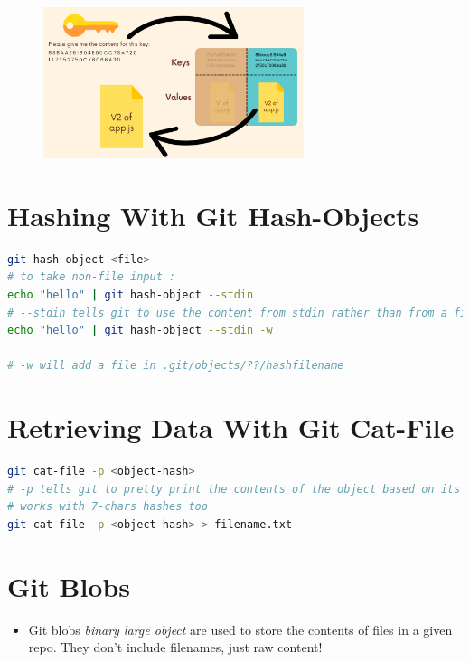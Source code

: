 \documentclass{report}
\begin{document}
\begin{figure}[H] 
	 \centering 
	 \includegraphics[width=3in]{screenshots/2022-07-10T15-18-37Z.png} 
\end{figure}


\section{Hashing With Git Hash-Objects}

\begin{tcolorbox}[title=Try Hashing,colback=backcolour]
\begin{lstlisting}[language=bash]
git hash-object <file>
# to take non-file input :
echo "hello" | git hash-object --stdin
# --stdin tells git to use the content from stdin rather than from a file
echo "hello" | git hash-object --stdin -w

# -w will add a file in .git/objects/??/hashfilename
\end{lstlisting}
\end{tcolorbox}


\section{Retrieving Data With Git Cat-File}

\begin{tcolorbox}[title=Retrieve Data,colback=backcolour]
\begin{lstlisting}[language=bash]
git cat-file -p <object-hash>
# -p tells git to pretty print the contents of the object based on its type
# works with 7-chars hashes too
git cat-file -p <object-hash> > filename.txt
\end{lstlisting}
\end{tcolorbox}


\section{Git Blobs}

\begin{itemize}
	\item Git blobs \textit{binary large object} are used to store the contents of files in a given repo. They don't include filenames, just raw content!
\end{itemize}
\end{document}
